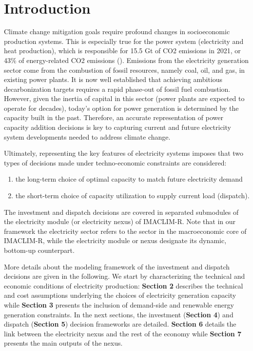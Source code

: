 \section{Introduction}
Climate change mitigation goals require profound changes in socioeconomic production systems. This is especially true for the power system (electricity and heat production), which is responsible for 15.5 Gt of CO2 emissions in 2021, or 43\% of energy-related CO2 emissions (\cite{IEA2021}). Emissions from the electricity generation sector come from the combustion of fossil resources, namely coal, oil, and gas, in existing power plants. It is now well established that achieving ambitious decarbonization targets requires a rapid phase-out of fossil fuel combustion. However, given the inertia of capital in this sector (power plants are expected to operate for decades), today's option for power generation is determined by the capacity built in the past. Therefore, an accurate representation of power capacity addition decisions is key to capturing current and future electricity system developments needed to address climate change.


Ultimately, representing the key features of electricity systems imposes that two types of decisions made under techno-economic constraints are considered:
\begin{enumerate}
    \item the long-term choice of optimal capacity to match future electricity demand
    \item the short-term choice of capacity utilization to supply current load (dispatch).
\end{enumerate}
The investment and dispatch decisions are covered in separated submodules of the electricity module (or electricity nexus) of IMACLIM-R. Note that in our framework the electricity sector refers to the sector in the macroeconomic core of IMACLIM-R, while the electricity module or nexus designate its dynamic, bottom-up counterpart.

More details about the modeling framework of the investment and dispatch decisions are given in the following. We start by characterizing the technical and economic conditions of electricity production:  \textbf{Section 2} describes the technical and cost assumptions underlying the choices of electricity generation capacity while \textbf{Section 3} presents the inclusion of demand-side and renewable energy generation constraints. In the next sections, the investment (\textbf{Section 4}) and dispatch (\textbf{Section 5}) decision frameworks are detailed. \textbf{Section 6}  details the link between the electricity nexus and the rest of the economy while \textbf{Section 7} presents the main outputs of the nexus.

